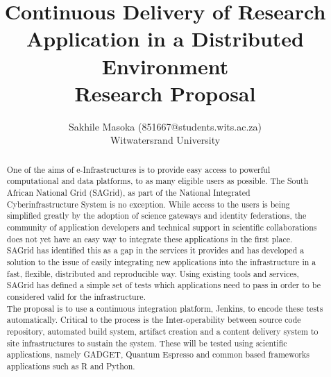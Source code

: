 \documentclass [titlepage,11pt]{article}
\title{\Huge Continuous Delivery of Research Application in a Distributed Environment \\\medskip Research Proposal}
\author{Sakhile Masoka (851667@students.wits.ac.za)\\Witwatersrand University}
\begin{document}
\maketitle



\begin{abstract}
One of the aims of e-Infrastructures is to provide easy access to powerful computational and data platforms, to as many eligible users as possible. The South African National Grid (SAGrid), as part of the National Integrated Cyberinfrastructure System is no exception. While access to the users is being simplified greatly by the adoption of science gateways and identity federations, the community of application developers and technical support in scientific collaborations does not yet have an easy way to integrate these applications in the first place.\\

SAGrid has identified this as a gap in the services it provides and has developed a solution to the issue of easily integrating new applications into the infrastructure in a fast, flexible, distributed and reproducible way. Using existing tools and services, SAGrid has defined a simple set of tests which applications need to pass in order to be considered valid for the infrastructure.\\  

The proposal is to use a continuous integration platform, Jenkins, to encode these tests automatically. Critical to the process is the Inter-operability between source code repository, automated build system, artifact creation and a content delivery system to site infrastructures to sustain the system. These will be tested using scientific applications, namely GADGET, Quantum Espresso and common based frameworks applications such as R and Python.

\end{abstract}


\tableofcontents{}
\listoffigures
\newpage


\end{document}
